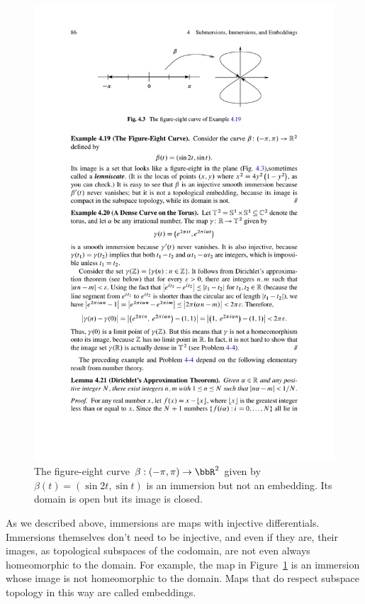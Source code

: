 \begin{figure}
    \centering
    \includegraphics{figures/immersion.pdf}
    \caption{The figure-eight curve $\beta:(-\pi,\pi)\to \bbR^2$ given by $\beta(t)=(\sin 2t,\sin t)$ is an immersion but not an embedding. Its domain is open but its image is closed.}
    \label{fig:immersion}
\end{figure}

As we described above, immersions are maps with injective differentials. Immersions themselves don't need to be injective, and even if they are, their images, as topological subspaces of the codomain, are not even always homeomorphic to the domain. For example, the map in Figure~\ref{fig:immersion} is an immersion whose image is not homeomorphic to the domain. Maps that do respect subspace topology in this way are called embeddings.

